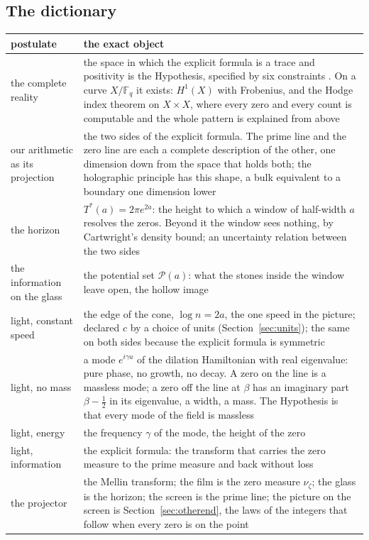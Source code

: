 \documentclass[11pt]{article}
\theoremstyle{definition}
\theoremstyle{remark}
\newcommand{\F}{\mathbb F}
\newcommand{\Tst}{T^{*}}
\newcommand{\PS}{\mathcal P}
\begin{document}
\subsection{The dictionary}
\begin{center}\small
\begin{tabular}{L{0.3\textwidth}L{0.64\textwidth}}
\toprule
postulate & the exact object\\
\midrule
the complete reality & the space in which the explicit formula is a trace and positivity is the Hypothesis, specified by six constraints \cite[\S4]{horizon}. On a curve $X/\F_q$ it exists: $H^1(X)$ with Frobenius, and the Hodge index theorem on $X\times X$, where every zero and every count is computable and the whole pattern is explained from above \cite{ffcone,reading}\\
our arithmetic as its projection & the two sides of the explicit formula. The prime line and the zero line are each a complete description of the other, one dimension down from the space that holds both; the holographic principle has this shape, a bulk equivalent to a boundary one dimension lower\\
the horizon & $\Tst(a)=2\pi e^{2a}$: the height to which a window of half-width $a$ resolves the zeros. Beyond it the window sees nothing, by Cartwright's density bound; an uncertainty relation between the two sides \cite[\S1]{arith}\\
the information on the glass & the potential set $\PS(a)$: what the stones inside the window leave open, the hollow image \cite{potential}\\
light, constant speed & the edge of the cone, $\log n=2a$, the one speed in the picture; declared $c$ by a choice of units (Section~\ref{sec:units}); the same on both sides because the explicit formula is symmetric\\
light, no mass & a mode $e^{i\gamma u}$ of the dilation Hamiltonian with real eigenvalue: pure phase, no growth, no decay. A zero on the line is a massless mode; a zero off the line at $\beta$ has an imaginary part $\beta-\tfrac12$ in its eigenvalue, a width, a mass. The Hypothesis is that every mode of the field is massless\\
light, energy & the frequency $\gamma$ of the mode, the height of the zero\\
light, information & the explicit formula: the transform that carries the zero measure to the prime measure and back without loss\\
the projector & the Mellin transform; the film is the zero measure $\nu_\zeta$; the glass is the horizon; the screen is the prime line; the picture on the screen is Section~\ref{sec:otherend}, the laws of the integers that follow when every zero is on the point\\

\end{tabular}
\end{center}
\end{document}
